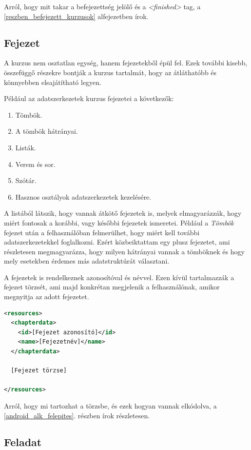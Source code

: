 \documentclass[12pt,a4paper]{article}
\begin{document}
	Arról, hogy mit takar a befejezettség jelölő és a \textit{<finished>} tag, a \ref{reszben_befejezett_kurzusok} alfejezetben írok.
	
	\subsection{Fejezet}\label{fejezet}
	
	A kurzus nem osztatlan egység, hanem fejezetekből épül fel. Ezek további kisebb, összefüggő részekre bontják a kurzus tartalmát, hogy az átláthatóbb és könnyebben elsajátítható legyen.
	
	Például az adatszerkezetek kurzus fejezetei a következők:
	
	\begin{enumerate}
		\item Tömbök.
		\item A tömbök hátrányai.
		\item Listák.
		\item Verem és sor.
		\item Szótár.
		\item Hasznos osztályok adatszerkezetek kezelésére.
	\end{enumerate}  

	A listából látszik, hogy vannak átkötő fejezetek is, melyek elmagyarázzák, hogy miért fontosak a korábbi, vagy későbbi fejezetek ismeretei. Például a \textit{Tömbök} fejezet után a felhasználóban felmerülhet, hogy miért kell további adatszerkezetekkel foglalkozni. Ezért közbeiktattam egy plusz fejezetet, ami részletesen megmagyarázza, hogy milyen hátrányai vannak a tömböknek és hogy mely esetekben érdemes más adatstruktúrát választani.
	
	A fejezetek is rendelkeznek azonosítóval és névvel. Ezen kívül tartalmazzák a fejezet törzsét, ami majd konkrétan megjelenik a felhasználónak, amikor megnyitja az adott fejezetet. 
	
	\bigskip
	\begin{lstlisting}[language=XML]
<resources>
  <chapterdata>
	<id>[Fejezet azonosító]</id>
    <name>[Fejezetnév]</name>
  </chapterdata>

  [Fejezet törzse]	
	
</resources>
	\end{lstlisting}
	
	Arról, hogy mi tartozhat a törzsbe, és ezek hogyan vannak elkódolva, a \ref{android_alk_felepites}. részben írok részletesen.
	
	\subsection{Feladat}\label{feladat}
	
\end{document}
